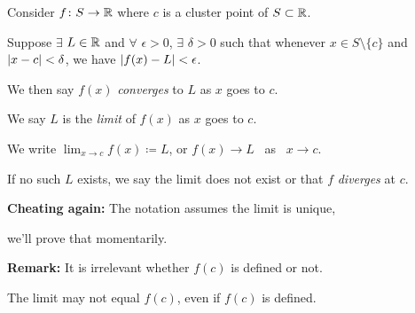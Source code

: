\documentclass[10pt,aspectratio=169]{beamer}
\begin{document}
\begin{frame}

\begin{definition}
Consider $f \colon S \to {\mathbb{R}}$ where $c$ is a cluster point of $S \subset {\mathbb{R}}$.

\pause
\medskip

Suppose $\exists$ $L \in {\mathbb{R}}$ and $\forall$ $\epsilon > 0$,
$\exists$ $\delta > 0$ such that whenever $x \in S \setminus \{ c \}$
and $\left\lvert {x - c} \right\rvert < \delta$, we have
\quad
$\left\lvert {f(x) - L} \right\rvert < \epsilon$.

\pause
\medskip

We then say $f(x)$ \emph{converges} to $L$ as $x$ goes
to $c$.

\pause
We say $L$ is the \emph{limit} of $f(x)$ as $x$ goes to $c$.

\pause
\medskip

We write \quad
$\displaystyle
\lim_{x \to c} f(x) \coloneqq L$, \quad
or \quad
$f(x) \to L$ ~as~ $x \to c$.

\pause
\medskip

If no such $L$ exists, we say the limit does not exist or
that $f$ \emph{diverges} at $c$.
\end{definition}

\pause
\textbf{Cheating again:} The notation assumes the limit is unique,

we'll prove that momentarily.

\pause
\medskip

\textbf{Remark:} It is irrelevant whether $f(c)$ is defined or not.

\pause
The limit may not equal $f(c)$, even if $f(c)$ is defined.
\end{frame}
\end{document}
